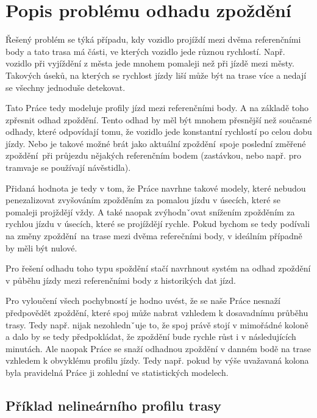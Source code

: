 \section{Popis problému odhadu zpoždění}

Řešený problém se týká případu, kdy vozidlo projíždí mezi dvěma referenčními body a tato trasa má části, ve kterých vozidlo jede různou rychlostí. Např. vozidlo při vyjíždění z města jede mnohem pomaleji než při jízdě mezi městy. Takových úseků, na kterých se rychlost jízdy liší může být na trase více a nedají se všechny jednoduše detekovat.

\bigbreak

Tato Práce tedy modeluje profily jízd mezi referenčními body. A na základě toho zpřesnit odhad zpoždění. Tento odhad by měl být mnohem přesnější než současné odhady, které odpovídají tomu, že vozidlo jede konstantní rychlostí po celou dobu jízdy. Nebo je takové možné brát jako aktuální zpoždění spoje poslední změřené zpoždění při průjezdu nějakých referenčním bodem (zastávkou, nebo např. pro tramvaje se používají návěstidla).

\bigbreak

Přidaná hodnota je tedy v tom, že Práce navrhne takové modely, které nebudou penezalizovat zvyšováním zpožděním za pomalou jízdu v úsecích, které se pomaleji projždějí vždy. A také naopak zvýhodnˇovat snížením zpožděním za rychlou jízdu v úsecích, které se projíždějí rychle. Pokud bychom se tedy podívali na změny zpoždění na trase mezi dvěma referečními body, v ideálním případně by měli být nulové.

\bigbreak

Pro řešení odhadu toho typu spoždění stačí navrhnout systém na odhad zpoždění v půběhu jízdy mezi referenčními body z historikých dat jízd.

\bigbreak

Pro vyloučení všech pochybností je hodno uvést, že se naše Práce nesnaží předpovědět zpoždění, které spoj může nabrat vzhledem k dosavadnímu průběhu trasy. Tedy např. nijak nezohlednˇuje to, že spoj právě stojí v mimořádné koloně a dalo by se tedy předpokládat, že zpoždění bude rychle růst i v následujících minutách. Ale naopak Práce se snaží odhadnou zpoždění v danném bodě na trase vzhledem k obvyklému profilu jízdy. Tedy např. pokud by výše uvažavaná kolona byla pravidelná Práce ji zohlední ve statistických modelech.


\subsection{Příklad nelineárního profilu trasy} \label{subsection:priklad_nelinearni_trasa}

